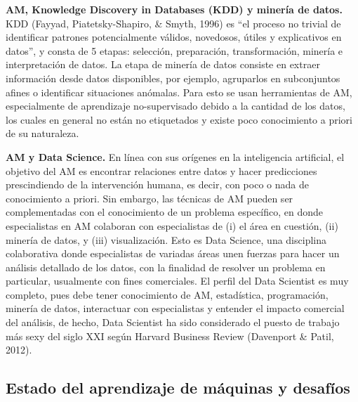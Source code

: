 \textbf{AM, Knowledge Discovery in Databases (KDD) y minería de datos.} KDD (Fayyad, Piatetsky-Shapiro, \& Smyth, 1996) es “el proceso no trivial de identificar patrones potencialmente válidos, novedosos, útiles y explicativos en datos”, y consta de 5 etapas: selección, preparación, transformación, minería e interpretación de datos. La etapa de minería de datos  consiste en extraer información desde datos disponibles, por ejemplo, agruparlos en subconjuntos afines o identificar situaciones anómalas. Para esto se usan herramientas de AM, especialmente de aprendizaje no-supervisado debido a la cantidad de los datos, los cuales en general no están no etiquetados y existe poco conocimiento a priori de su naturaleza. 

\textbf{AM y Data Science.} En línea con sus orígenes en la inteligencia artificial, el objetivo del AM es encontrar relaciones entre datos y hacer predicciones prescindiendo de la intervención humana, es decir, con poco o nada de conocimiento a priori. Sin embargo, las técnicas de AM pueden ser complementadas con el conocimiento de un problema específico, en donde especialistas en AM colaboran con especialistas de (i) el área en cuestión, (ii) minería de datos, y (iii) visualización. Esto es Data Science, una disciplina colaborativa donde especialistas de variadas áreas unen fuerzas para hacer un análisis detallado de los datos, con la finalidad de resolver un problema en particular, usualmente con fines comerciales. El perfil del Data Scientist es muy completo, pues debe tener conocimiento de AM, estadística, programación, minería de datos, interactuar con especialistas y entender el impacto comercial del análisis, de hecho, Data Scientist ha sido considerado el puesto de trabajo más sexy del siglo XXI según Harvard Business Review (Davenport \& Patil, 2012).

\subsection{}

\subsection{Estado del aprendizaje de máquinas y desafíos}

